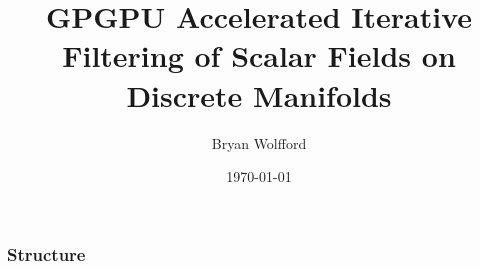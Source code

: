 \documentclass[a4paper, openany]{beamer}
\author{Bryan Wolfford}
\title{GPGPU Accelerated Iterative Filtering of Scalar Fields on Discrete Manifolds}
\date{\today}
\begin{document}
\maketitle

\begin{frame}
\frametitle{Structure}

\end{frame}
\end{document}
